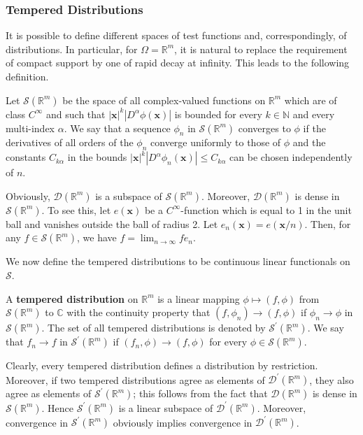 \subsubsection{Tempered Distributions}\label{subsec:tempered-distributions}

It is possible to define different spaces of test functions and, correspondingly, of distributions. In particular, for $\Omega=\mathbb{R}^m$, it is natural to replace the requirement of compact support by one of rapid decay at infinity. This leads to the following definition.

\begin{Definition}
\label{def:rapidly-decreasing-test-space}
Let $\mathcal{S}(\mathbb{R}^m)$ be the space of all complex-valued functions on $\mathbb{R}^m$ which are of class $C^\infty$ and such that $|\bm{x}|^k|D^\alpha\phi(\bm{x})|$ is bounded for every $k\in\mathbb{N}$ and every multi-index $\alpha$. We say that a sequence $\phi_n$ in $\mathcal{S}(\mathbb{R}^m)$ converges to $\phi$ if the derivatives of all orders of the $\phi_n$ converge uniformly to those of $\phi$ and the constants $C_{k\alpha}$ in the bounds $|\bm{x}|^k|D^\alpha\phi_n(\bm{x})|\leq C_{k\alpha}$ can be chosen independently of $n$.
\end{Definition}

Obviously, $\mathcal{D}(\mathbb{R}^m)$ is a subspace of $\mathcal{S}(\mathbb{R}^m)$. Moreover, $\mathcal{D}(\mathbb{R}^m)$ is dense in $\mathcal{S}(\mathbb{R}^m)$. To see this, let $e(\bm{x})$ be a $C^\infty$-function which is equal to 1 in the unit ball and vanishes outside the ball of radius 2. Let $e_n(\bm{x})=e(\bm{x}/n)$. Then, for any $f\in\mathcal{S}(\mathbb{R}^m)$, we have $f=\lim_{n\to\infty}fe_n$.

We now define the tempered distributions to be continuous linear functionals on $\mathcal{S}$.

\begin{Definition}
\label{def:tempered-distribution}
A \textbf{tempered distribution} on $\mathbb{R}^m$ is a linear mapping $\phi\mapsto(f,\phi)$ from $\mathcal{S}(\mathbb{R}^m)$ to $\mathbb{C}$ with the continuity property that $(f,\phi_n)\to(f,\phi)$ if $\phi_n\to\phi$ in $\mathcal{S}(\mathbb{R}^m)$. The set of all tempered distributions is denoted by $\mathcal{S}^{\prime}(\mathbb{R}^m)$. We say that $f_n\to f$ in $\mathcal{S}^{\prime}(\mathbb{R}^m)$ if $(f_n,\phi)\to(f,\phi)$ for every $\phi\in\mathcal{S}(\mathbb{R}^m)$.
\end{Definition}

Clearly, every tempered distribution defines a distribution by restriction. Moreover, if two tempered distributions agree as elements of $\mathcal{D}^{\prime}(\mathbb{R}^m)$, they also agree as elements of $\mathcal{S}^{\prime}(\mathbb{R}^m)$; this follows from the fact that $\mathcal{D}(\mathbb{R}^m)$ is dense in $\mathcal{S}(\mathbb{R}^m)$. Hence $\mathcal{S}^{\prime}(\mathbb{R}^m)$ is a linear subspace of $\mathcal{D}^{\prime}(\mathbb{R}^m)$. Moreover, convergence in $\mathcal{S}^{\prime}(\mathbb{R}^m)$ obviously implies convergence in $\mathcal{D}^{\prime}(\mathbb{R}^m)$.
